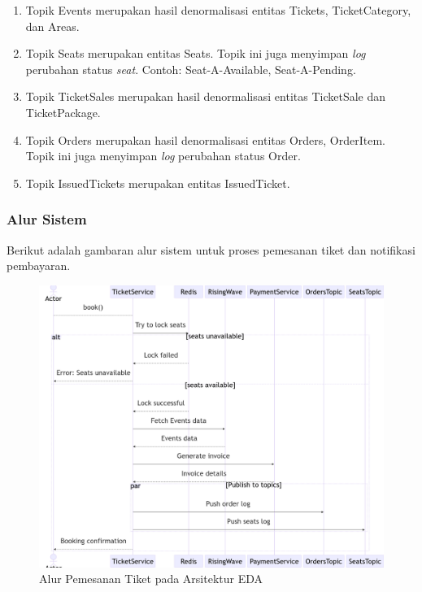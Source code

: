 \begin{enumerate}
    \item Topik Events merupakan hasil denormalisasi entitas Tickets, TicketCategory, dan Areas.
    \item Topik Seats merupakan entitas Seats. Topik ini juga menyimpan \textit{log} perubahan status \textit{seat}. Contoh: Seat-A-Available, Seat-A-Pending.
    \item Topik TicketSales merupakan hasil denormalisasi entitas TicketSale dan TicketPackage.
    \item Topik Orders merupakan hasil denormalisasi entitas Orders, OrderItem. Topik ini juga menyimpan \textit{log} perubahan status Order.
    \item Topik IssuedTickets merupakan entitas IssuedTicket.
\end{enumerate}

\subsubsection{Alur Sistem}

Berikut adalah gambaran alur sistem untuk proses pemesanan tiket dan notifikasi pembayaran.

\begin{figure}[htbp]
    \centering
    \includegraphics[width=1\textwidth]{resources/appendix/eda-book.png}
    \caption{Alur Pemesanan Tiket pada Arsitektur EDA}
    \label{fig:book-flow-eda}
\end{figure}

